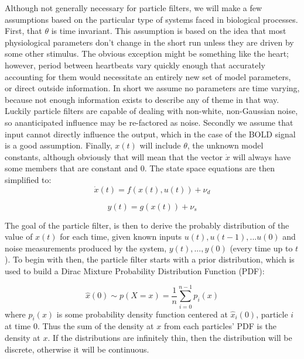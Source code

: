 \documentclass{article}
\begin{document}
Although not generally necessary for particle filters, we will make a few
assumptions based on the particular type of systems faced in biological 
processes. First, that $\theta$ is time invariant. This assumption is 
based on the idea that most physiological parameters don't change in the 
short run unless they are driven by some other stimulus. The obvious exception
might be something like the heart; however, period between heartbeats vary quickly enough that accurately accounting for them would necessitate an entirely
new set of model parameters, or direct outside information. In short we
assume no parameters are time varying, because not enough information exists to
describe any of theme in that way. Luckily particle filters are capable 
of dealing with non-white, non-Gaussian noise, so ananticipated influence
may be re-factored as noise. Secondly we assume that input cannot directly
influence the output, which in the case of the BOLD signal is a good assumption.
Finally, $x(t)$ will include $\theta$, the unknown model constants, although
obviously that will mean that the vector $\dot{x}$ will always have some members
that are constant and 0. The state space equations are then simplified to:
\begin{equation}
\dot{x}(t) = f(x(t), u(t)) + \nu_d
\end{equation}

\begin{equation}
y(t) = g(x(t)) + \nu_s
\end{equation}

The goal of the particle filter, is then to derive the probably distribution
of the value of $x(t)$
for each time, given known inputs $u(t), u(t-1), ... u(0)$  and noise 
measurements produced by the system, $y(t), ... , y(0)$ (every time up to
$t$). To begin with then, the particle filter starts with a prior distribution,
which is used to build a Dirac Mixture Probability Distribution Function (PDF):

\begin{equation}
\hat{x}(0) \sim p(X = x) = \frac{1}{n}\sum_{i = 0}^{n-1}p_i(x)
\end{equation}
where $p_i(x)$ is some probability density function centered at $\hat{x}_i(0)$, particle
$i$ at time $0$. Thus the sum of the density at $x$ from each particles' PDF is the density
at $x$. If
the distributions are infinitely thin, then the distribution will be discrete, otherwise
it will be continuous. 
\end{document}
